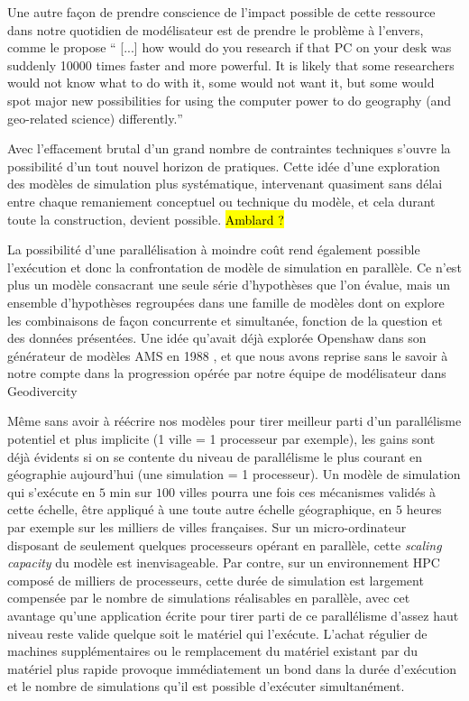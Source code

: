 Une autre façon de prendre conscience de l'impact possible de cette ressource dans notre quotidien de modélisateur est de prendre le problème à l'envers, comme le propose \textcite{Openshaw2000}  \foreignquote{english}{ [...] how would do you research if that PC on your desk was suddenly 10000 times faster and more powerful. It is likely that some researchers would not know what to do with it, some would not want it, but some would spot major new possibilities for using the computer power to do geography (and geo-related science) differently.}

Avec l'effacement brutal d'un grand nombre de contraintes techniques s'ouvre la possibilité d'un tout nouvel horizon de pratiques. Cette idée d'une exploration des modèles de simulation plus systématique, intervenant quasiment sans délai entre chaque remaniement conceptuel ou technique du modèle, et cela durant toute la construction, devient possible. \hl{Amblard ?}

La possibilité d'une parallélisation à moindre coût rend également possible l'exécution et donc la confrontation de modèle de simulation en parallèle. Ce n'est plus un modèle consacrant une seule série d'hypothèses que l'on évalue, mais un ensemble d'hypothèses regroupées dans une famille de modèles dont on explore les combinaisons de façon concurrente et simultanée, fonction de la question et des données présentées. Une idée qu'avait déjà explorée Openshaw dans son générateur de modèles AMS en 1988 \autocite{Openshaw1988}, et que nous avons reprise sans le savoir à notre compte dans la progression opérée par notre équipe de modélisateur dans Geodivercity \autocite{Cottineau2014b}

Même sans avoir à réécrire nos modèles pour tirer meilleur parti d'un parallélisme potentiel et plus implicite (1 ville = 1 processeur par exemple), les gains sont déjà évidents si on se contente du niveau de parallélisme le plus courant en géographie aujourd'hui (une simulation = 1 processeur). Un modèle de simulation qui s’exécute en $5$ min sur $100$ villes pourra une fois ces mécanismes validés à cette échelle, être appliqué à une toute autre échelle géographique, en $5$ heures par exemple sur les milliers de villes françaises. Sur un micro-ordinateur disposant de seulement quelques processeurs opérant en parallèle, cette \textit{scaling capacity} du modèle est inenvisageable. Par contre, sur un environnement HPC composé de milliers de processeurs, cette durée de simulation est largement compensée par le nombre de simulations réalisables en parallèle, avec cet avantage qu'une application écrite pour tirer parti de ce parallélisme d'assez haut niveau reste valide quelque soit le matériel qui l'exécute. L'achat régulier de machines supplémentaires ou le remplacement du matériel existant par du matériel plus rapide provoque immédiatement un bond dans la durée d'exécution et le nombre de simulations qu'il est possible d'exécuter simultanément.


